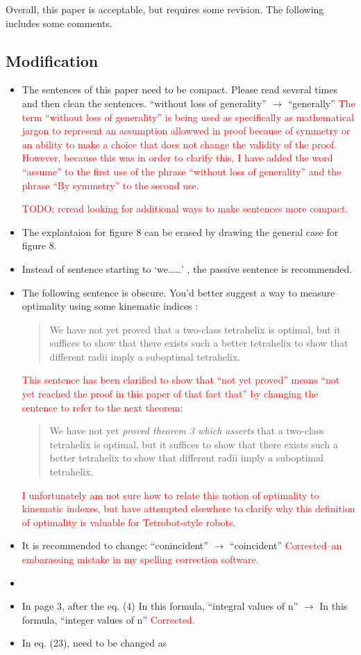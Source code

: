 \documentclass{article}
\newcommand{\highlighttext}[1] {\textcolor{red}{#1}}
\begin{document}
Overall, this paper is acceptable, but requires some revision. The following includes some comments.

\subsection{Modification}
\begin{itemize}
\item
The sentences of this paper need to be compact. Please read several times and then clean
the sentences.
``without loss of generality'' $\rightarrow$ ``generally''
\highlighttext{The term ``without loss of generality'' is being used as specifically as mathematical jargon\cite{wiki:wolog} to represent an assumption allowwed in proof because of symmetry or an ability to make
  a choice that does not change the validity of the proof.
  However, because this was in order to clarify this, I have added the word ``assume'' to the first use of the phrase ``without loss of generality'' and the phrase ``By symmetry'' to the second use.
  }

\highlighttext{TODO: reread looking for additional ways to make sentences more compact.}
\item
  The explantaion for figure 8 can be erased by drawing the general case for figure 8.
  \item
    Instead of sentence starting to ‘we……’ , the passive sentence is recommended.
    \item 
 The following sentence is obscure. You’d better suggest a way to measure optimality using
 some kinematic indices :
\begin{quote}
 We have not yet proved that a two-class tetrahelix is optimal, but it suffices to show
that there exists such a better tetrahelix to show that different radii imply a suboptimal
tetrahelix.
\end{quote}

\highlighttext{This sentence has been clarified to show that ``not yet proved'' means
  ``not yet reached the proof in this paper of that fact that'' by changing the sentence to refer
  to the next theorem:
  \begin{quote}
  We have not yet {\em
proved theorem 3 which asserts} that a two-class tetrahelix is optimal, but it suffices to show that there
exists such a better tetrahelix to show that different radii imply a suboptimal
tetrahelix.
  \end{quote}
  I unfortunately am not sure how to relate this notion of optimality to kinematic indexes, but
  have attempted elsewhere to clarify why this definition of optimality is valuable for
  Tetrobot-style robots.
  }
\item 
 It is recommended to change:
 ``conincident'' $\rightarrow$ ``coincident''
 \highlighttext{Corrected--an embarassing mistake in my spelling correction software.}
 \item
\item In page 3, after the eq. (4)
  In this formula, ``integral values of n'' $\rightarrow$ In this formula, ``integer values of n''
  \highlighttext{Corrected.}
  \item 
In eq. (23), need to be changed as


\end{itemize}
\end{document}
